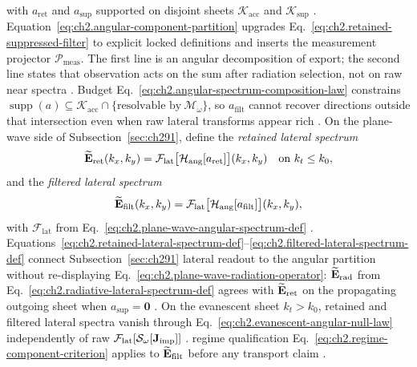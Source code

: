 with \(a_{\mathrm{ret}}\) and \(a_{\mathrm{sup}}\) supported on disjoint sheets
\(\mathcal{K}_{\mathrm{acc}}\) and \(\mathcal{K}_{\mathrm{sup}}\)
\cite{stratton1941}. Equation~\eqref{eq:ch2.angular-component-partition} upgrades
Eq.~\eqref{eq:ch2.retained-suppressed-filter} to explicit locked definitions and
inserts the measurement projector \(\mathcal{P}_{\mathrm{meas}}\). The first line is an angular
decomposition of export; the second line states that observation acts on the sum after radiation
selection, not on raw near spectra \cite{stratton1941}. Budget
Eq.~\eqref{eq:ch2.angular-spectrum-composition-law} constrains
\(\operatorname{supp}(a)\subseteq\mathcal{K}_{\mathrm{acc}}\cap\{\text{resolvable by}\ \mathcal{M}_\omega\}\),
so \(a_{\mathrm{filt}}\) cannot recover directions outside that intersection even when raw
lateral transforms appear rich \cite{harrington2001}.
On the plane-wave side of Subsection~\ref{sec:ch291}, define the \emph{retained lateral spectrum}
\begin{equation}
\label{eq:ch2.retained-lateral-spectrum-def}
\widetilde{\mathbf{E}}_{\mathrm{ret}}(k_x,k_y)
=
\mathcal{F}_{\mathrm{lat}}\big[\mathcal{H}_{\mathrm{ang}}[a_{\mathrm{ret}}]\big](k_x,k_y)
\quad\text{on}\ k_t\le k_0,
\end{equation}
and the \emph{filtered lateral spectrum}
\begin{equation}
\label{eq:ch2.filtered-lateral-spectrum-def}
\widetilde{\mathbf{E}}_{\mathrm{filt}}(k_x,k_y)
=
\mathcal{F}_{\mathrm{lat}}\big[\mathcal{H}_{\mathrm{ang}}[a_{\mathrm{filt}}]\big](k_x,k_y),
\end{equation}
with \(\mathcal{F}_{\mathrm{lat}}\) from Eq.~\eqref{eq:ch2.plane-wave-angular-spectrum-def}
\cite{stratton1941}. Equations~\eqref{eq:ch2.retained-lateral-spectrum-def}--\eqref{eq:ch2.filtered-lateral-spectrum-def}
connect Subsection~\ref{sec:ch291} lateral readout to the angular partition without re-displaying
Eq.~\eqref{eq:ch2.plane-wave-radiation-operator}: \(\widetilde{\mathbf{E}}_{\mathrm{rad}}\) from
Eq.~\eqref{eq:ch2.radiative-lateral-spectrum-def} agrees with
\(\widetilde{\mathbf{E}}_{\mathrm{ret}}\) on the propagating outgoing sheet when
\(a_{\mathrm{sup}}=\mathbf{0}\) \cite{stratton1941}. On the evanescent sheet
\(k_t>k_0\), retained and filtered lateral spectra vanish through
Eq.~\eqref{eq:ch2.evanescent-angular-null-law} independently of raw
\(\mathcal{F}_{\mathrm{lat}}[\mathcal{S}_\omega[\mathbf{J}_{\mathrm{imp}}]]\) \cite{stratton1941}.
regime qualification Eq.~\eqref{eq:ch2.regime-component-criterion} applies to
\(\widetilde{\mathbf{E}}_{\mathrm{filt}}\) before any transport claim \cite{harrington2001}.
